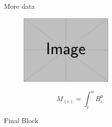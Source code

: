 \documentclass{beamer}
\begin{document}
\begin{frame}[t]
\begin{columns}[t]
\begin{column2}
 	\end{column2}
 	\begin{column2}
 		\begin{block}{More data}
\lipsum[68][1-7]

\begin{figure}
	\centering
	\includegraphics[width=0.75\textwidth]{imgs/example-image.png}
	\label{referencetoimage}
	\caption{\small\lipsum[66][1-7]}
\end{figure}
\lipsum[48][1-5]

\begin{equation}
 M_(e) = \int_{i}^{n} B_i^{0}
\end{equation}

\lipsum[18][2-8]
		\end{block}

	    \begin{block}{Final Block}
\lipsum[124][1-14]

\vspace*{0.15em}

		\end{block}
	\end{column2}
\end{columns}
\end{frame}
\end{document}
